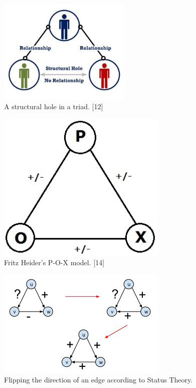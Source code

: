 \documentclass[conference,letterpaper]{IEEEtran}
\begin{document}
\begin{center}
\begin{figure}[hb]
\centering
\includegraphics[width=2.5in]{structural_hole}
\caption{
A structural hole in a triad. [12]
}
\label{fig_sim}
\end{figure}
\end{center}

\begin{center}
\begin{figure}[hb]
\centering
\includegraphics[width=3.2in]{pox}
\caption{
Fritz Heider's P-O-X model. [14]
}
\label{fig_sim}
\end{figure}
\end{center}

\begin{center}
\begin{figure}[hb]
\centering
\includegraphics[width=3.2in]{status_theory}
\caption{
Flipping the direction of an edge according to Status Theory.
}
\label{fig_sim}
\end{figure}
\end{center}
\end{document}
